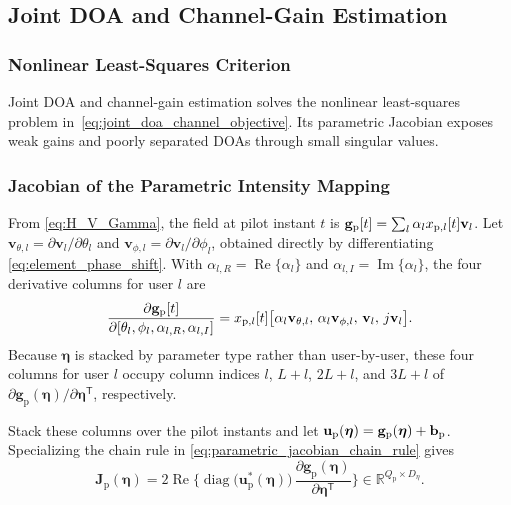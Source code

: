 \documentclass[journal]{IEEEtran}
\begin{document}
\subsection{Joint DOA and Channel-Gain Estimation}
\label{subsec:joint_doa_channel_estimation}

\subsubsection{Nonlinear Least-Squares Criterion}

Joint DOA and channel-gain estimation solves the nonlinear least-squares
problem in~\eqref{eq:joint_doa_channel_objective}. Its parametric Jacobian
exposes weak gains and poorly separated DOAs through small singular values.

\subsubsection{Jacobian of the Parametric Intensity Mapping}

From \eqref{eq:H_V_Gamma}, the field at pilot instant $t$ is
$\mathbf g_{\rm p}[t]=\sum_l\alpha_lx_{{\rm p},l}[t]\mathbf v_l$.
Let $\mathbf v_{\theta,l}=\partial\mathbf v_l/\partial\theta_l$ and
$\mathbf v_{\phi,l}=\partial\mathbf v_l/\partial\phi_l$, obtained directly by
differentiating \eqref{eq:element_phase_shift}. With
$\alpha_{l,R}=\operatorname{Re}\{\alpha_l\}$ and
$\alpha_{l,I}=\operatorname{Im}\{\alpha_l\}$, the four derivative columns for
user $l$ are
\begin{equation}
\label{eq:training_field_derivatives}
\frac{\partial\mathbf g_{\rm p}[t]}
{\partial[\theta_l,\phi_l,\alpha_{l,R},\alpha_{l,I}]}
=x_{{\rm p},l}[t]
\bigl[\alpha_l\mathbf v_{\theta,l},\,
\alpha_l\mathbf v_{\phi,l},\,\mathbf v_l,\,j\mathbf v_l\bigr].
\end{equation}
Because $\boldsymbol\eta$ is stacked by parameter type rather than user-by-user,
these four columns for user $l$ occupy column indices $l$, $L+l$, $2L+l$,
and $3L+l$ of $\partial\mathbf{g}_{\mathrm{p}}(\boldsymbol{\eta})/\partial\boldsymbol{\eta}^{\mathsf{T}}$,
respectively.

Stack these columns over the pilot instants and let
$\mathbf u_{\rm p}(\boldsymbol\eta)=\mathbf g_{\rm p}(\boldsymbol\eta)+
\mathbf b_{\rm p}$. Specializing the chain rule in
\eqref{eq:parametric_jacobian_chain_rule} gives
\begin{equation}
\mathbf{J}_{\mathrm{p}}(\boldsymbol{\eta})
=
2\operatorname{Re}
\Biggl\{
\operatorname{diag}
\bigl(\mathbf{u}_{\mathrm{p}}^{*}(\boldsymbol{\eta})\bigr)\,
\frac{\partial\mathbf{g}_{\mathrm{p}}(\boldsymbol{\eta})}
     {\partial\boldsymbol{\eta}^{\mathsf{T}}}
\Biggr\}
\in
\mathbb{R}^{Q_{\mathrm{p}}\times D_{\eta}}.
\label{eq:parametric_intensity_jacobian_column}
\end{equation}
\end{document}
